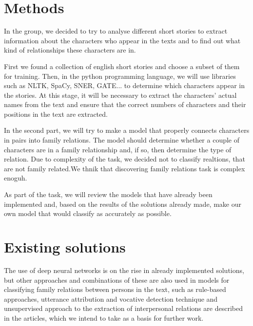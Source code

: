 \documentclass[fleqn,moreauthors,10pt]{ds_report}
\begin{document}
\section*{Methods}

In the group, we decided to try to analyse different short stories to extract information about the characters who appear in the texts and to find out what kind of relationships these characters are in.

First we found a collection of english short stories and choose a subset of them for training. Then, in the python programming language, we will use libraries such as NLTK, SpaCy, SNER, GATE... to determine which characters appear in the stories. At this stage, it will be necessary to extract the characters' actual names from the text and ensure that the correct numbers of characters and their positions in the text are extracted.

In the second part, we will try to make a model that properly connects characters in pairs into family relations. The model should determine whether a couple of characters are in a family relationship and, if so, then determine the type of relation. Due to complexity of the task, we decided not to classify realtions, that are not family related.We thnik that discovering family relations task is complex enoguh.

As part of the task, we will review the models that have already been implemented and, based on the results of the solutions already made, make our own model that would classify as accurately as possible.




\section*{Existing solutions}

The use of deep neural networks is on the rise in already implemented solutions, but other approaches and combinations of these are also used in models for classifying family relations between persons in the text, such as rule-based approaches, utterance attribution and vocative detection technique and unsupervised approach to the extraction of interpersonal relations are described in the articles, which we intend to take as a basis for further work. \cite{caselli2017event} \cite{nahatame2020revisiting} \cite{trabasso1985causal} \cite{mostafazadeh2016corpus} \cite{dasgupta2018automatic} \cite{mcnamara2012coh} \cite{zwaan1995dimensions} \cite{zwaan1999situation}
\end{document}
